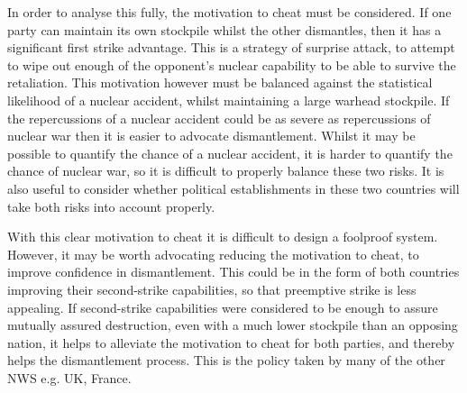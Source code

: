 \documentclass[twocolumn,a4paper]{article}
\begin{document}
In order to analyse this fully, the motivation to cheat must be considered. 
If one party can maintain its own stockpile whilst the other dismantles, 
then it has a significant first strike advantage. This is a strategy of 
surprise attack, to attempt to wipe out enough of the opponent's nuclear 
capability to be able to survive the retaliation. This motivation however
must be balanced against the statistical likelihood of a nuclear accident, 
whilst maintaining a large warhead stockpile. If the repercussions of a 
nuclear accident could be as severe as repercussions of nuclear war then 
it is easier to advocate dismantlement. Whilst it may be possible to 
quantify the chance of a nuclear accident, it is harder to quantify the
chance of nuclear war, so it is difficult to properly balance these two
risks. It is also useful to consider whether political establishments 
in these two countries will take both risks into account properly.

With this clear motivation to cheat it is difficult to design a foolproof
system. However, it may be worth advocating reducing the motivation to 
cheat, to improve confidence in dismantlement. This could be in the form 
of both countries improving their second-strike capabilities, so that 
preemptive strike is less appealing. If second-strike capabilities were 
considered to be enough to assure mutually assured destruction, even 
with a much lower stockpile than an opposing nation, it helps to
alleviate the motivation to cheat for both parties, and thereby helps 
the dismantlement process. This is the policy taken by many of the 
other NWS e.g. UK, France.

\renewcommand{\refname}{\vspace*{-1.5em}\section{Bibliography}\vspace*{-1em}}


\end{document}
